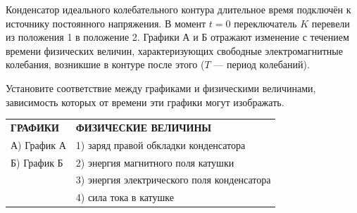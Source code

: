\begin{taskbasic}[code={\label{task:elem_osc_v5_n15}}]
Конденсатор идеального колебательного контура длительное время подключён к источнику постоянного напряжения. В момент $t = 0$ переключатель $K$ перевели из положения 1 в положение 2. Графики А и Б отражают изменение с течением времени физических величин, характеризующих свободные электромагнитные колебания, возникшие в контуре после этого ($T$ --- период колебаний).

\nopagebreak\smallskip
\begin{center}
\qquad
{}
\end{center}

Установите соответствие между графиками и физическими величинами, зависимость которых от времени эти графики могут изображать.

\smallskip
\begin{tabular}{p{}p{}}
\textbf{ГРАФИКИ} & \textbf{ФИЗИЧЕСКИЕ ВЕЛИЧИНЫ} \\
А) График А & 1) заряд правой обкладки конденсатора \\
Б) График Б & 2) энергия магнитного поля катушки \\
& 3) энергия электрического поля конденсатора \\
& 4) сила тока в катушке
\end{tabular}

\end{taskbasic}

